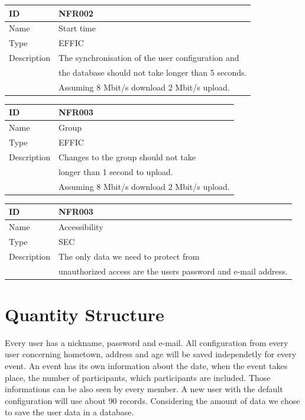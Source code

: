 \documentclass[12pt]{article}
\theoremstyle{definition}
\begin{document}
\vspace*{1 cm}

\begin{flushleft}
  \begin{tabular}{|l|l|}
  \hline
  ID &  NFR002\\ \hline
  Name & Start time \\ \hline
  Type &  EFFIC\\ \hline
  Description & The synchronisation of the user configuration and \\
  & the database should not take longer than 5 seconds. \\ 
  & Assuming 8 Mbit/s download 2 Mbit/s upload. \\ \hline
  \end{tabular}
\end{flushleft}

\vspace*{1 cm}

\begin{flushleft}
  \begin{tabular}{|l|l|}
  \hline
  ID &  NFR003\\ \hline
  Name & Group \\ \hline
  Type &  EFFIC\\ \hline
  Description & Changes to the group should not take \\
  & longer than 1 second to upload. \\ 
  & Assuming 8 Mbit/s download 2 Mbit/s upload. \\ \hline
  \end{tabular}
\end{flushleft}

\vspace*{1 cm}

\begin{flushleft}
  \begin{tabular}{|l|l|}
  \hline
  ID &  NFR003\\ \hline
  Name & Accessibility \\ \hline
  Type &  SEC \\ \hline
  Description & The only data we need to protect from \\
  & unauthorized access are the users password and e-mail address. \\ \hline
  \end{tabular}
\end{flushleft}


\pagebreak

\section{Quantity Structure}
Every user has a nickname, password and e-mail. All configuration from every user concerning hometown, address and age will be saved independetly for every event. An event has its
own information about the date, when the event takes place, the number of participants, which participants are included. Those informations can be also seen by every member. A new user with the default configuration will use about 90 records. Considering the amount of data we chose to save the user data in a database. 
\end{document}
